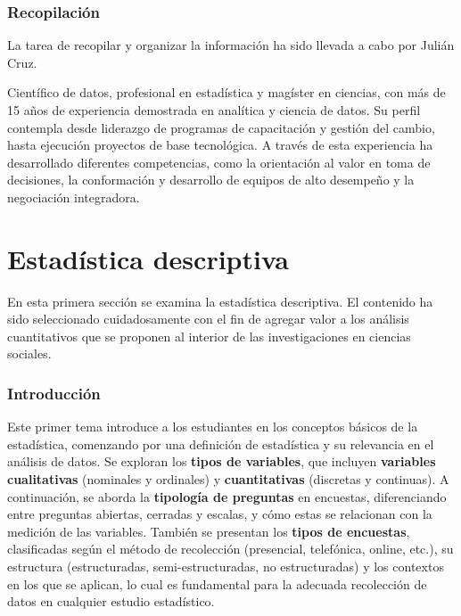 \documentclass[
  letterpaper,
  DIV=11,
  numbers=noendperiod]{scrreprt}
\begin{document}
\section*{Recopilación}\label{recopilaciuxf3n}


La tarea de recopilar y organizar la información ha sido llevada a cabo
por Julián Cruz.

Científico de datos, profesional en estadística y magíster en ciencias,
con más de 15 años de experiencia demostrada en analítica y ciencia de
datos. Su perfil contempla desde liderazgo de programas de capacitación
y gestión del cambio, hasta ejecución proyectos de base tecnológica. A
través de esta experiencia ha desarrollado diferentes competencias, como
la orientación al valor en toma de decisiones, la conformación y
desarrollo de equipos de alto desempeño y la negociación integradora.

\part{Estadística descriptiva}

En esta primera sección se examina la estadística descriptiva. El
contenido ha sido seleccionado cuidadosamente con el fin de agregar
valor a los análisis cuantitativos que se proponen al interior de las
investigaciones en ciencias sociales.

\section*{Introducción}\label{introducciuxf3n}


Este primer tema introduce a los estudiantes en los conceptos básicos de
la estadística, comenzando por una definición de estadística y su
relevancia en el análisis de datos. Se exploran los \textbf{tipos de
variables}, que incluyen \textbf{variables cualitativas} (nominales y
ordinales) y \textbf{cuantitativas} (discretas y continuas). A
continuación, se aborda la \textbf{tipología de preguntas} en encuestas,
diferenciando entre preguntas abiertas, cerradas y escalas, y cómo estas
se relacionan con la medición de las variables. También se presentan los
\textbf{tipos de encuestas}, clasificadas según el método de recolección
(presencial, telefónica, online, etc.), su estructura (estructuradas,
semi-estructuradas, no estructuradas) y los contextos en los que se
aplican, lo cual es fundamental para la adecuada recolección de datos en
cualquier estudio estadístico.
\end{document}

